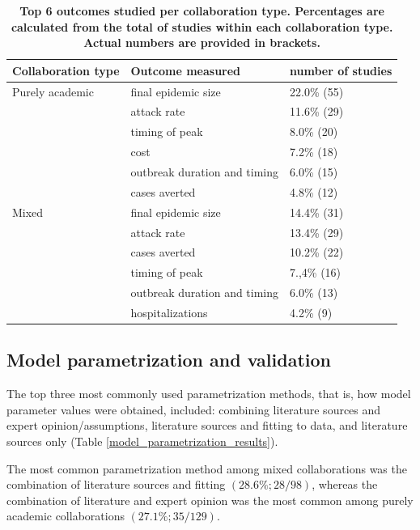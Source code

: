 \documentclass[10pt,letterpaper]{article}
\begin{document}
\begin{table}[h!]
	 \caption{\textbf{Top 6 outcomes studied per collaboration type. Percentages are calculated from the total of studies within each collaboration type. Actual numbers are provided in brackets.}}
	 \centering
	 \begin{tabular}{| l | l | l |}\hline
	 	\textbf{Collaboration type} & \textbf{Outcome measured} & \textbf{number of studies} \\ \hline
	 	Purely academic & final epidemic size & 22.0\%  (55)\\ \hline
	 	 & attack rate & 11.6\%  (29)\\ \hline
	 	 & timing of peak & 8.0\%  (20)\\ \hline
	 	 & cost & 7.2\%  (18)\\ \hline
	 	 & outbreak duration and timing & 6.0\%  (15)\\ \hline
	 	 & cases averted & 4.8\%  (12)\\ \hline
	 	Mixed & final epidemic size & 14.4\%  (31)\\ \hline
	 	 & attack rate & 13.4\%  (29)\\ \hline
	 	 & cases averted & 10.2\%  (22)\\ \hline
	 	 & timing of peak & 7.,4\%  (16)\\ \hline
	 	 & outbreak duration and timing & 6.0\%  (13)\\ \hline
	 	 & hospitalizations & 4.2\%   (9)\\ \hline
 	\end{tabular}
 	\label{top 6 outcomes studied by collab types}
 	\end{table}

\subsection*{Model parametrization and validation}
The top three most commonly used parametrization methods, that is, how model parameter values were obtained, included: combining literature sources and expert opinion/assumptions, literature sources and fitting to data, and literature sources only (Table \ref{model_parametrization_results}). 

The most common parametrization method among mixed collaborations was the combination of literature sources and fitting $(28.6 \%; 28/98)$, whereas the combination of literature and expert opinion was the most common among purely academic collaborations $(27.1\%; 35/129)$. 
\end{document}
